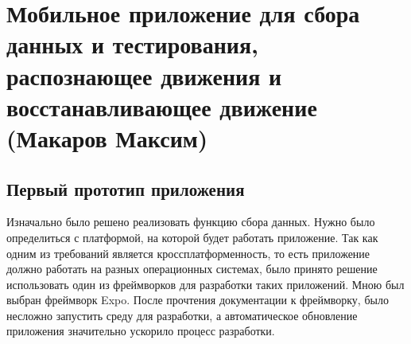 \newpage
\section{Мобильное приложение для сбора данных и тестирования, распознающее движения и восстанавливающее движение (Макаров Максим)}

\subsection{Первый прототип приложения}


Изначально было решено реализовать функцию сбора данных. 
Нужно было определиться с платформой, на которой будет работать приложение. Так как одним из требований является кроссплатформенность, то есть приложение должно работать на разных операционных системах, было принято решение использовать один из фреймворков для разработки таких приложений.
Мною был выбран фреймворк Expo.
После прочтения документации к фреймворку, было несложно запустить среду для разработки, а автоматическое обновление приложения значительно ускорило процесс разработки.


